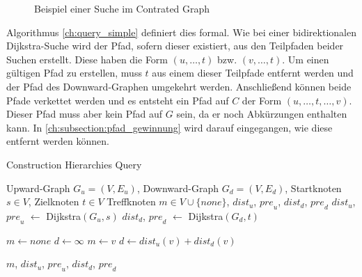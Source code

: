 \begin{figure}[ht]
  \centering
  \caption{Beispiel einer Suche im Contrated Graph}
  \label{fig:ch:beispiel_suche}
\end{figure}

Algorithmus \ref{ch:query_simple} definiert dies formal.
Wie bei einer bidirektionalen Dijkstra-Suche wird der Pfad, sofern dieser existiert, aus den Teilpfaden beider Suchen erstellt.
Diese haben die Form $(u, \dotsc, t)$ bzw. $(v, \dotsc, t)$.
Um einen gültigen Pfad zu erstellen, muss $t$ aus einem dieser Teilpfade entfernt werden und der Pfad des Downward-Graphen umgekehrt werden.
Anschließend können beide Pfade verkettet werden und es entsteht ein Pfad auf $C$ der Form $(u, \dotsc, t, \dotsc, v)$.
Dieser Pfad muss aber kein Pfad auf $G$ sein, da er noch Abkürzungen enthalten kann.
In \autoref{ch:subsection:pfad_gewinnung} wird darauf eingegangen, wie diese entfernt werden können.

\begin{algorithm}[ht]
  \caption{Construction Hierarchies Query}
  \begin{algorithmic}[1]
    \Require Upward-Graph $G_u = (V, E_u)$, Downward-Graph $G_d = (V, E_d)$, Startknoten $s \in V$, Zielknoten $t \in V$
    \Ensure Treffknoten $m \in V \cup \{ {none} \}$, ${dist}_u$, ${pre}_u$, ${dist}_d$, ${pre}_d$
    \State ${dist}_u$, ${pre}_u$ $\leftarrow$ Dijkstra$(G_u, s)$
    \State ${dist}_d$, ${pre}_d$ $\leftarrow$ Dijkstra$(G_d, t)$

    \State
    \State $m \leftarrow {none}$
    \State $d \leftarrow \infty$
    \State
    \State $m \leftarrow v$
    \State $d \leftarrow {dist}_u(v) + {dist}_d(v)$
    \EndIf
    \EndFor

    \State
    \State \Return $m$, ${dist}_u$, ${pre}_u$, ${dist}_d$, ${pre}_d$
  \end{algorithmic}
  \label{ch:query_simple}
\end{algorithm}

